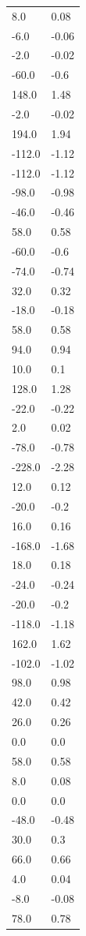 \begin{longtable}{ll}
8.0 & 0.08 \\
-6.0 & -0.06 \\
-2.0 & -0.02 \\
-60.0 & -0.6 \\
148.0 & 1.48 \\
-2.0 & -0.02 \\
194.0 & 1.94 \\
-112.0 & -1.12 \\
-112.0 & -1.12 \\
-98.0 & -0.98 \\
-46.0 & -0.46 \\
58.0 & 0.58 \\
-60.0 & -0.6 \\
-74.0 & -0.74 \\
32.0 & 0.32 \\
-18.0 & -0.18 \\
58.0 & 0.58 \\
94.0 & 0.94 \\
10.0 & 0.1 \\
128.0 & 1.28 \\
-22.0 & -0.22 \\
2.0 & 0.02 \\
-78.0 & -0.78 \\
-228.0 & -2.28 \\
12.0 & 0.12 \\
-20.0 & -0.2 \\
16.0 & 0.16 \\
-168.0 & -1.68 \\
18.0 & 0.18 \\
-24.0 & -0.24 \\
-20.0 & -0.2 \\
-118.0 & -1.18 \\
162.0 & 1.62 \\
-102.0 & -1.02 \\
98.0 & 0.98 \\
42.0 & 0.42 \\
26.0 & 0.26 \\
0.0 & 0.0 \\
58.0 & 0.58 \\
8.0 & 0.08 \\
0.0 & 0.0 \\
-48.0 & -0.48 \\
30.0 & 0.3 \\
66.0 & 0.66 \\
4.0 & 0.04 \\
-8.0 & -0.08 \\
78.0 & 0.78 \\

\end{longtable}
